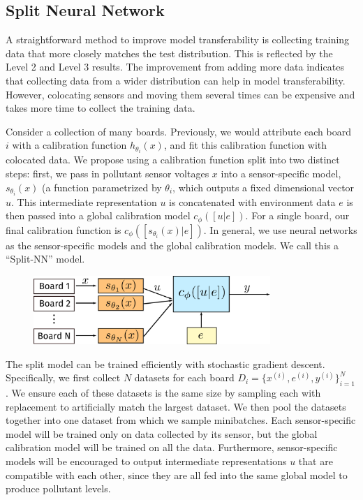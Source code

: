 \documentclass[journal abbreviation, manuscript]{copernicus}
\begin{document}

\subsection{Split Neural Network}

A straightforward method to improve model transferability is collecting training data that more closely matches the test distribution.
This is reflected by the Level 2 and Level 3 results. The improvement from adding more data indicates that collecting data from a wider distribution can help in model transferability.
However, colocating sensors and moving them
several times can be expensive and takes more time to collect the training data.

Consider a collection of many boards. Previously, we would attribute each board $i$ with a calibration function $h_{\theta_i}(x)$, and fit this calibration function with colocated data.
We propose using a calibration function split into two distinct steps: first, we pass in pollutant sensor voltages $x$ into a sensor-specific model, $s_{\theta_i}(x)$ (a function parametrized by $\theta_i$, which outputs a fixed dimensional vector $u$. This intermediate representation $u$ is concatenated with environment data $e$ is then passed into a global calibration model $c_\phi([u | e])$. For a single board, our final calibration function is $c_\phi([s_{\theta_i}(x) | e])$.
In general, we use neural networks as the sensor-specific models and the global calibration models. We call this a ``Split-NN'' model. 

\begin{figure}
    \includegraphics[width=0.8\textwidth]{writeup/img/split-model.png}
    \caption{}
\end{figure}

The split model can be trained efficiently with stochastic gradient descent. Specifically, we first collect $N$ datasets for each board $D_i = \{x^{(i)}, e^{(i)}, y^{(i)}\}_{i = 1}^N$. We ensure each of these datasets is the same size by sampling each with replacement to artificially match the largest dataset. We then pool the datasets together into one dataset from which we sample minibatches. Each sensor-specific model will be trained only on data collected by its sensor, but the global calibration model will be trained on all the data. Furthermore, sensor-specific models will be encouraged to output intermediate representations $u$ that are compatible with each other, since they are all fed into the same global model to produce pollutant levels.
\end{document}
